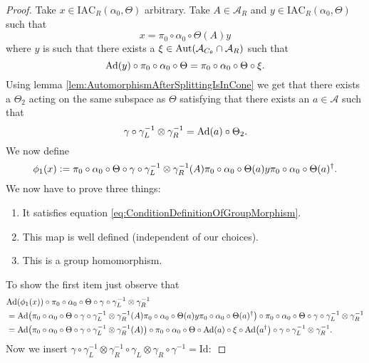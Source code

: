 \documentclass[12pt,a4paper,twoside]{article}
\newcommand{\defeq}{\vcentcolon=}
\let\originalleft\left
\let\originalright\right
\renewcommand{\left}{\mathopen{}\mathclose\bgroup\originalleft}
\renewcommand{\right}{\aftergroup\egroup\originalright}
\renewcommand{\AA}{\mathcal A}
\newcommand{\Ad}[1]{\textrm{Ad}\left(#1\right)}
\newcommand{\Aut}[1]{\textrm{Aut}\left(#1\right)}
\theoremstyle{definition}
\numberwithin{equation}{section}
\begin{document}
\begin{proof}
	Take $x\in \textrm{IAC}_R(\alpha_0,\Theta)$ arbitrary. Take $A\in\AA_R$ and $y\in\textrm{IAC}_R(\alpha_0,\Theta)$ such that
	\begin{equation}
	x=\pi_0\circ\alpha_0\circ\Theta(A)y
	\end{equation}
	where $y$ is such that there exists a $\xi\in\Aut{\AA_{C_\theta}\cap \AA_R}$ such that
	\begin{equation}
	\Ad{y}\circ\pi_0\circ\alpha_0\circ\Theta=\pi_0\circ\alpha_0\circ\Theta\circ\xi.
	\end{equation}
	Using lemma \ref{lem:AutomorphismAfterSplittingIsInCone} we get that there exists a $\Theta_2$ acting on the same subspace as $\Theta$ satisfying that there exists an $a\in\AA$ such that
	\begin{equation}\label{eq:ConePropertyLemmaDefinitionOfGroupMorphism}
		\gamma\circ\gamma_L^{-1}\otimes\gamma_R^{-1}=\Ad{a}\circ\Theta_2.
	\end{equation}
	We now define
	\begin{equation}
		\phi_1(x)\defeq \pi_0\circ\alpha_0\circ\Theta\circ\gamma\circ\gamma_L^{-1}\otimes\gamma_R^{-1}(A)\pi_0\circ\alpha_0\circ\Theta(a)y\pi_0\circ\alpha_0\circ\Theta(a)^\dagger.
	\end{equation}
	We now have to prove three things:
	\begin{enumerate}
		\item It satisfies equation \eqref{eq:ConditionDefinitionOfGroupMorphism}.
		\item This map is well defined (independent of our choices).
		\item This is a group homomorphism.
	\end{enumerate}
	To show the first item just observe that
	\begin{align}
		&\Ad{\phi_1(x)}\circ\pi_0\circ\alpha_0\circ\Theta\circ\gamma\circ\gamma_L^{-1}\otimes\gamma_R^{-1}\\
		&=\Ad{\pi_0\circ\alpha_0\circ\Theta\circ\gamma\circ\gamma_L^{-1}\otimes\gamma_R^{-1}(A)\pi_0\circ\alpha_0\circ\Theta(a)y\pi_0\circ\alpha_0\circ\Theta(a)^\dagger}\circ\pi_0\circ\alpha_0\circ\Theta\circ\gamma\circ\gamma_L^{-1}\otimes\gamma_R^{-1}\\
		&=\Ad{\pi_0\circ\alpha_0\circ\Theta\circ\gamma\circ\gamma_L^{-1}\otimes\gamma_R^{-1}(A)}\circ\pi_0\circ\alpha_0\circ\Theta\circ\Ad{a}\circ\xi\circ\Ad{a^\dagger}\circ\gamma\circ\gamma_L^{-1}\otimes\gamma_R^{-1}.
	\end{align}
	Now we insert $\gamma\circ\gamma_L^{-1}\otimes\gamma_R^{-1}\circ\gamma_L\otimes\gamma_R\circ\gamma^{-1}=\text{Id}:$

\end{proof}
\end{document}

